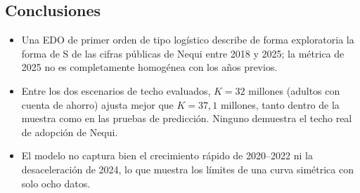 \documentclass[12pt,a4paper]{article}
\begin{document}
\subsection{Conclusiones}
\begin{itemize}
  \item Una EDO de primer orden de tipo log\'istico describe de forma exploratoria la forma de S de las cifras p\'ublicas de Nequi entre 2018 y 2025; la m\'etrica de 2025 no es completamente homog\'enea con los a\~nos previos.
  \item Entre los dos escenarios de techo evaluados, $K=32$ millones (adultos con cuenta de ahorro) ajusta mejor que $K=37{,}1$ millones, tanto dentro de la muestra como en las pruebas de predicci\'on. Ninguno demuestra el techo real de adopci\'on de Nequi.
  \item El modelo no captura bien el crecimiento r\'apido de 2020--2022 ni la desaceleraci\'on de 2024, lo que muestra los l\'imites de una curva sim\'etrica con solo ocho datos.
\end{itemize}
\end{document}
